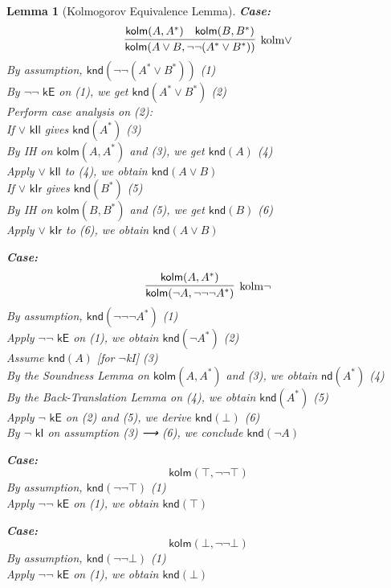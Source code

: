 \documentclass{article}
\newtheorem{lemma}{Lemma}
\begin{document}
\begin{lemma}[Kolmogorov Equivalence Lemma]
    \medskip
    
    \noindent \textbf{Case:} 
    \[
    \infer[\text{kolm$\vee$}]{\textsf{kolm}(A \vee B, \neg\neg (A^* \vee B^*))}{
      \textsf{kolm}(A, A^*) \quad \textsf{kolm}(B, B^*)
    }
    \]
    By assumption, $\textsf{knd}(\neg\neg (A^* \vee B^*))$ \hfill (1)\\
    By $\textsf{$\neg\neg$ kE}$ on (1), we get $\textsf{knd}(A^* \vee B^*)$ \hfill (2)\\
    Perform case analysis on (2):\\
    \quad If $\textsf{$\vee$ kIl}$ gives $\textsf{knd}(A^*)$ \hfill (3)\\
    \quad \quad By IH on $\textsf{kolm}(A, A^*)$ and (3), we get $\textsf{knd}(A)$ \hfill (4)\\
    \quad \quad Apply $\textsf{$\vee$ kIl}$ to (4), we obtain $\textsf{knd}(A \vee B)$\\
    \quad If $\textsf{$\vee$ kIr}$ gives $\textsf{knd}(B^*)$ \hfill (5)\\
    \quad \quad By IH on $\textsf{kolm}(B, B^*)$ and (5), we get $\textsf{knd}(B)$ \hfill (6)\\
    \quad \quad Apply $\textsf{$\vee$ kIr}$ to (6), we obtain $\textsf{knd}(A \vee B)$
    
    \medskip
    
    \noindent \textbf{Case:} 
    \[
    \infer[\text{kolm$\neg$}]{\textsf{kolm}(\neg A, \neg\neg\neg A^*)}{
      \textsf{kolm}(A, A^*)
    }
    \]
    By assumption, $\textsf{knd}(\neg\neg\neg A^*)$ \hfill (1)\\
    Apply $\textsf{$\neg\neg$ kE}$ on (1), we obtain $\textsf{knd}(\neg A^*)$ \hfill (2)\\
    Assume $\textsf{knd}(A)$ [for $\neg$kI] \hfill (3)\\
    By the Soundness Lemma on $\textsf{kolm}(A, A^*)$ and (3), we obtain $\textsf{nd}(A^*)$ \hfill (4)\\
    By the Back-Translation Lemma on (4), we obtain $\textsf{knd}(A^*)$ \hfill (5)\\
    Apply $\textsf{$\neg$ kE}$ on (2) and (5), we derive $\textsf{knd}(\bot)$ \hfill (6)\\
    By $\textsf{$\neg$ kI}$ on assumption (3) ⟶ (6), we conclude $\textsf{knd}(\neg A)$
    
    \medskip
    
    \noindent \textbf{Case:} 
    \[
    \textsf{kolm}(\top, \neg\neg \top)
    \]
    By assumption, $\textsf{knd}(\neg\neg \top)$ \hfill (1)\\
    Apply $\textsf{$\neg\neg$ kE}$ on (1), we obtain $\textsf{knd}(\top)$
    
    \medskip
    
    \noindent \textbf{Case:} 
    \[
    \textsf{kolm}(\bot, \neg\neg \bot)
    \]
    By assumption, $\textsf{knd}(\neg\neg \bot)$ \hfill (1)\\
    Apply $\textsf{$\neg\neg$ kE}$ on (1), we obtain $\textsf{knd}(\bot)$
    \end{lemma}
    
\end{document}
